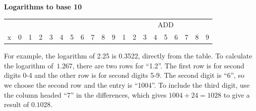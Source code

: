 \documentclass[10pt]{article}
\begin{document}
\begin{center}
  {\Large\bf Logarithms to base 10}
\end{center}

\pagestyle{empty}
\thispagestyle{empty}
\begin{table}[ht]
  \centering
  \small
\begin{tabular}{|r|c|ccc|ccc|ccc|ccccccccc|}\hline
  &&&&&&&&&&&  \multicolumn{9}{|c|}{ADD} \\
  {\normalsize x}&
  {\normalsize 0}&{\normalsize 1}&{\normalsize 2}&
  {\normalsize 3}&{\normalsize 4}&{\normalsize 5}&
  {\normalsize 6}&{\normalsize 7}&{\normalsize 8}&
  {\normalsize 9}&{\normalsize 1}&{\normalsize 2}&
  {\normalsize 3}&{\normalsize 4}&{\normalsize 5}&
  {\normalsize 6}&{\normalsize 7}&{\normalsize 8}&
  {\normalsize 9}\\ \hline

\hline
\end{tabular}
\end{table}

\noindent For example, the logarithm of 2.25 is 0.3522, directly from
the table.  To calculate the logarithm of~$1.267$, there are two rows
for ``1.2''.  The first row is for second digits 0-4 and the other row
is for second digits 5-9.  The second digit is ``6'', so we choose the
second row and the entry is ``1004''.  To include the third digit, use
the column headed ``7'' in the differences, which gives $1004+24=1028$
to give a result of $0.1028$.

\end{document}
